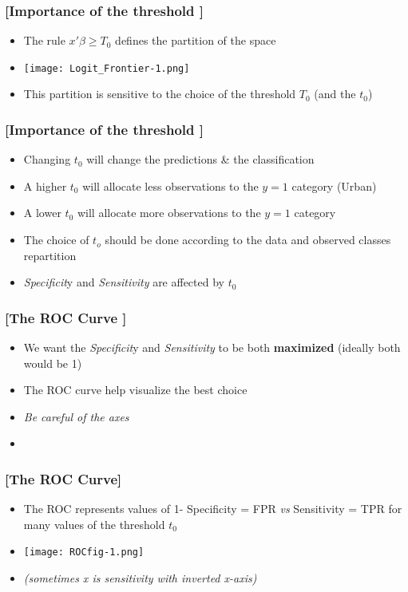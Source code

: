 \documentclass[xcolor=x11names,compress]{beamer}
\renewcommand{\(}{\begin{columns}}
\renewcommand{\)}{\end{columns}}
\newcommand{\<}[1]{\begin{column}{#1}}
\renewcommand{\>}{\end{column}}
\begin{document}
\begin{frame} %
\frametitle{\textcolor{brique}{[Importance of the threshold ]}}
\pause
 \begin{itemize}[<+->]
  \item The rule $ x'\beta \geq T_0$ defines the partition of the space
  \item[] \begin{center}\texttt{[image: Logit\_Frontier-1.png]} \end{center}
  \item This partition is sensitive to the choice of the threshold $T_0$ (and the $t_0$)
\end{itemize}
\end{frame}

\begin{frame} %
\frametitle{\textcolor{brique}{[Importance of the threshold ]}}
\pause
 \begin{itemize}[<+->]
  \item Changing $t_0$ will  change the predictions \&  the classification
  \item[] A higher $t_0$ will allocate less observations to the $y=1$ category (Urban)
  \item[] A lower $t_0$ will allocate more observations to the $y=1$ category
  \item The choice of $t_o$ should be done according to the data and observed classes repartition
  \item \textit{Specificit}y and \textit{Sensitivity} are affected by $t_0$
\end{itemize}
\end{frame}

\begin{frame} %
\frametitle{\textcolor{brique}{[The ROC Curve ]}}
\pause
 \begin{itemize}[<+->]
  \item We want the \textit{Specificit}y and \textit{Sensitivity} to be both \textbf{maximized} (ideally both would be 1)
  \item The ROC curve help visualize the best choice
  \item[] \textit{Be careful of the axes }
  \item
\end{itemize}
\end{frame}

\begin{frame} %
\frametitle{\textcolor{brique}{[The ROC Curve]}}
\pause
 \begin{itemize}[<+->]
  \item[] The ROC represents values of 1- Specificity =  FPR  \textit{vs} Sensitivity =  TPR for many values of the threshold $t_0$
  \item[] \begin{center}\texttt{[image: ROCfig-1.png]} \end{center}
  \item \textit{(sometimes  x is sensitivity  with inverted x-axis)}
\end{itemize}
\end{frame}
\end{document}
